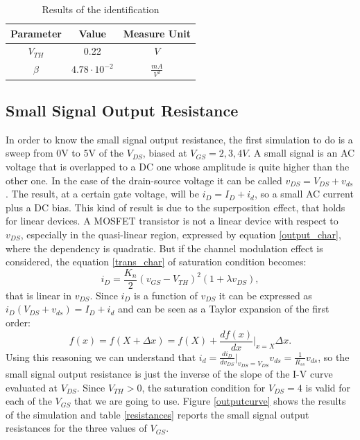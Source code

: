 \documentclass[11pt,a4paper]{article}
\begin{document}
	\begin{table}
		\caption{Results of the identification}
		\centering
		\begin{tabular}[H]{|| c | c | c ||}
			\hline
			Parameter & Value & Measure Unit \\ [0.5ex] 
			\hline\hline
			$V_{TH}$ & 0.22 & $V$\\
			\hline
			$\beta$ & $4.78\cdot 10^{-2}$ & $\frac{mA}{V^2}$\\
			\hline			
		\end{tabular}
		\label{identification_results}
	\end{table}
	\subsection{Small Signal Output Resistance}
	In order to know the small signal output resistance, the first simulation to do is a sweep from 0V to 5V of the $V_{DS}$, biased at $V_{GS} = 2,3,4V$. A small signal is an AC voltage that is overlapped to a DC one whose amplitude is quite higher than the other one. In the case of the drain-source voltage it can be called $v_{DS} = V_{DS} + v_{ds}$. The result, at a certain gate voltage, will be $i_D = I_D+i_d$, so a small AC current plus a DC bias. This kind of result is due to the superposition effect, that holds for linear devices. A MOSFET transistor is not a linear device with respect to $v_{DS}$, especially in the quasi-linear region, expressed by equation \ref*{output_char}, where the dependency is quadratic. But if the channel modulation effect is considered, the equation \ref*{trans_char} of saturation condition becomes:
	\begin{equation} \label{channel_mod}
		 i_D = \frac{K_n}{2}(v_{GS}-V_{TH})^2(1+\lambda v_{DS}),
	\end{equation}
	that is linear in $v_{DS}$. Since $i_D$ is a function of $v_{DS}$ it can be expressed as $i_{D}(V_{DS}+v_{ds}) = I_D + i_d $ and can be seen as a Taylor expansion of the first order: 
	\begin{equation} \label{taylor}
	f(x) = f(X+\Delta x) = f(X)+ \frac{df(x)}{dx} \Bigr\rvert_{x = X} \Delta x.
	\end{equation}
	Using this reasoning we can understand that $i_d = \frac{di_D}{dv_{DS}}\Bigr\rvert_{v_{DS} = V_{DS}}v_{ds} = \frac{1}{R_{ss}}v_{ds}$, so the small signal output resistance is just the inverse of the slope of the I-V curve evaluated at $V_{DS}$. Since $V_{TH} > 0$, the saturation condition for $V_{DS} = 4$ is valid for each of the $V_{GS}$ that we are going to use. Figure \ref*{outputcurve} shows the results of the simulation and table \ref*{resistances} reports the small signal output resistances for the three values of $V_{GS}$.
\end{document}
